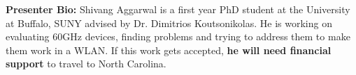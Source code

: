 \textbf{Presenter Bio: }
Shivang Aggarwal is a first year PhD student at the University at Buffalo, SUNY advised by Dr. Dimitrios Koutsonikolas. 
He is working on evaluating 60GHz devices, finding problems and trying to address them to make them work in a WLAN.
If this work gets accepted, \textbf{he will need financial support} to travel to North Carolina.